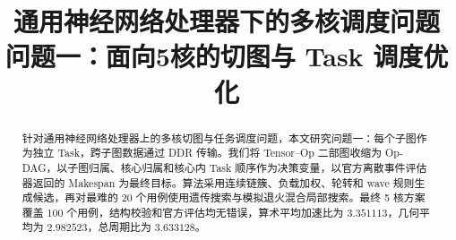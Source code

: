 \documentclass[bwprint]{gmcmthesis}
\title{通用神经网络处理器下的多核调度问题\\问题一：面向5核的切图与 Task 调度优化}
\begin{document}
\maketitle
\begin{abstract}
针对通用神经网络处理器上的多核切图与任务调度问题，本文研究问题一：每个子图作为独立 Task，跨子图数据通过 DDR 传输。我们将 Tensor--Op 二部图收缩为 Op-DAG，以子图归属、核心归属和核心内 Task 顺序作为决策变量，以官方离散事件评估器返回的 Makespan 为最终目标。算法采用连续链簇、负载加权、轮转和 wave 规则生成候选，再对最难的 20 个用例使用遗传搜索与模拟退火混合局部搜索。最终 5 核方案覆盖 100 个用例，结构校验和官方评估均无错误，算术平均加速比为 $3.351113$，几何平均为 $2.982523$，总周期比为 $3.633128$。
\end{abstract}
\pagestyle{plain}
\maketoc
\clearpage

\end{document}
